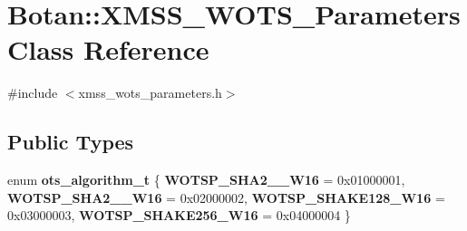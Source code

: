 \hypertarget{class_botan_1_1_x_m_s_s___w_o_t_s___parameters}{}\section{Botan\+:\+:X\+M\+S\+S\+\_\+\+W\+O\+T\+S\+\_\+\+Parameters Class Reference}
\label{class_botan_1_1_x_m_s_s___w_o_t_s___parameters}


{\ttfamily \#include $<$xmss\+\_\+wots\+\_\+parameters.\+h$>$}

\subsection*{Public Types}
\begin{DoxyCompactItemize}
\item 
\mbox{\label{class_botan_1_1_x_m_s_s___w_o_t_s___parameters_a5a19c4431fda7a80fa3e116d072349c3}} 
enum {\bfseries ots\+\_\+algorithm\+\_\+t} \{ {\bfseries W\+O\+T\+S\+P\+\_\+\+S\+H\+A2\+\_\+\_\+\+W16} = 0x01000001, 
{\bfseries W\+O\+T\+S\+P\+\_\+\+S\+H\+A2\+\_\+\_\+\+W16} = 0x02000002, 
{\bfseries W\+O\+T\+S\+P\+\_\+\+S\+H\+A\+K\+E128\+\_\+\+W16} = 0x03000003, 
{\bfseries W\+O\+T\+S\+P\+\_\+\+S\+H\+A\+K\+E256\+\_\+\+W16} = 0x04000004
 \}
\end{DoxyCompactItemize}
